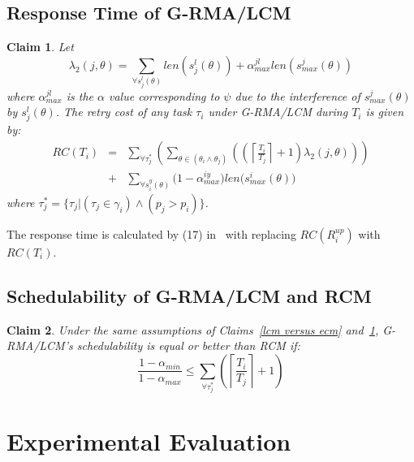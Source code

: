 \documentclass{sig-alternate}
\newtheorem{clm}{Claim}
\begin{document}
\subsection{Response Time of G-RMA/LCM}
\label{rma}

\begin{clm}\label{response g-rma/lcm}
Let 
\begin{equation*}
\lambda_{2}(j,\theta) = \sum_{\forall s_{j}^{l}(\theta)}len(s_{j}^{l}(\theta))+\alpha_{max}^{jl}len(s_{max}^{j}(\theta))
\end{equation*}
 where $\alpha_{max}^{jl}$ is the $\alpha$ value corresponding to $\psi$ due to the interference of $s_{max}^j(\theta)$ by $s_j^l(\theta)$. The retry cost of any task $\tau_i$ under G-RMA/LCM during $T_i$ 
is given by:
\begin{eqnarray}
RC\left(T_i\right) & = &
  \sum_{\forall \tau_{j}^{*}}\left(\sum_{\theta\in(\theta_{i}\wedge\theta_{j})}\left(\left(\left\lceil\frac{T_i}{T_{j}}\right\rceil +1\right)\lambda_{2}(j,\theta)\right)\right)\nonumber\\
& + & \sum_{\forall s_{i}^{y}(\theta)}\Big(1-\alpha_{max}^{iy}\Big)len\Big(s_{max}^i(\theta)\Big)
\label{eq60}
\end{eqnarray}
where $\tau_{j}^{*}=\{\tau_{j}|(\tau_{j}\in\gamma_{i})\wedge(p_{j}>p_{i})\}$.
\end{clm}

The response time is calculated by (17) in~\cite{stmconcurrencycontrol:emsoft11} with replacing $RC(R_i^{up})$ with $RC(T_i)$.

\subsection{Schedulability of G-RMA/LCM and RCM}
\label{rma eval}

\begin{clm}\label{rma_eval_clm}
Under the same assumptions of Claims~\ref{lcm versus ecm} and~\ref{response g-rma/lcm}, G-RMA/LCM's schedulability is equal or better than RCM if:
\begin{equation}
\frac{1-\alpha_{min}}{1-\alpha_{max}}\le \sum_{\forall \tau_j^*}\left( \left\lceil\frac{T_i}{T_j}\right\rceil +1 \right)
\label{eq70}\end{equation}
\end{clm}

\section{Experimental Evaluation}\label{exp_eval}
\end{document}
